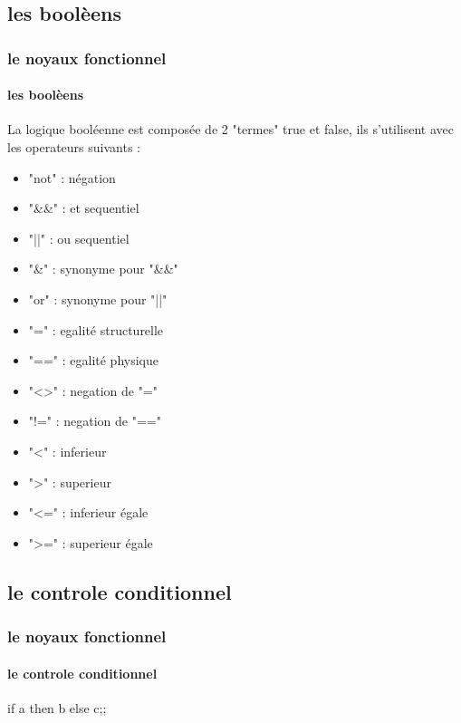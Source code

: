   \subsection{les boolèens}
\begin{frame}
    \frametitle{le noyaux fonctionnel}
    \framesubtitle{les boolèens}
      La logique booléenne est composée de 2 "termes" true et false, ils s'utilisent avec les operateurs suivants :
      \begin{center}
      \begin{minipage}[t]{7cm}
	  \begin{itemize}
	    \item "not" : négation
	    \item "\&\&" : et sequentiel
	    \item "||" : ou sequentiel
	    \item "\&" : synonyme pour "\&\&"
	    \item "or" : synonyme pour "||"
	  \end{itemize}
	\end{minipage}
      \end{center}
	\begin{minipage}[t]{5cm}
	  \begin{itemize}
	    \item "=" : egalité structurelle
	    \item "==" : egalité physique
	    \item "<>" : negation de "="
	    \item "!=" : negation de "=="
	  \end{itemize}
	\end{minipage}
	\begin{minipage}[t]{5cm}
	  \begin{itemize}
	    \item "<" : inferieur 
	    \item ">" : superieur
	    \item "<=" : inferieur égale
	    \item ">=" : superieur égale
	  \end{itemize}
	\end{minipage}
\end{frame}
    \subsection{le controle conditionnel}
\begin{frame}
      \frametitle{le noyaux fonctionnel}
      \framesubtitle{le controle conditionnel}
      \begin{center}
      if a then b else c;;
  \end{center}
\end{frame}
